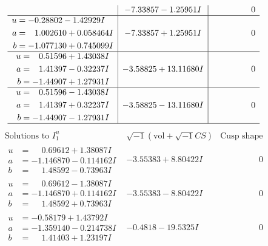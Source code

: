 \documentclass[1p]{elsarticle_modified}
\theoremstyle{definition}
\newcommand{\I}{\sqrt{-1}}
\begin{document}
$$\begin{array}{c|c|c}
 & -7.33857 - 1.25951 I & \phantom{-0.000000 } 0 \\ \hline\begin{aligned}
u &= -0.28802 - 1.42929 I \\
a &= \phantom{-}1.002610 + 0.058464 I \\
b &= -1.077130 + 0.745099 I\end{aligned}
 & -7.33857 + 1.25951 I & \phantom{-0.000000 } 0 \\ \hline\begin{aligned}
u &= \phantom{-}0.51596 + 1.43038 I \\
a &= \phantom{-}1.41397 - 0.32237 I \\
b &= -1.44907 + 1.27931 I\end{aligned}
 & -3.58825 + 13.11680 I & \phantom{-0.000000 } 0 \\ \hline\begin{aligned}
u &= \phantom{-}0.51596 - 1.43038 I \\
a &= \phantom{-}1.41397 + 0.32237 I \\
b &= -1.44907 - 1.27931 I\end{aligned}
 & -3.58825 - 13.11680 I & \phantom{-0.000000 } 0\\
 \hline 
 \end{array}$$\newpage$$\begin{array}{c|c|c}  
\text{Solutions to }I^u_{1}& \I (\text{vol} + \sqrt{-1}CS) & \text{Cusp shape}\\
 \hline 
\begin{aligned}
u &= \phantom{-}0.69612 + 1.38087 I \\
a &= -1.146870 - 0.114162 I \\
b &= \phantom{-}1.48592 - 0.73963 I\end{aligned}
 & -3.55383 + 8.80422 I & \phantom{-0.000000 } 0 \\ \hline\begin{aligned}
u &= \phantom{-}0.69612 - 1.38087 I \\
a &= -1.146870 + 0.114162 I \\
b &= \phantom{-}1.48592 + 0.73963 I\end{aligned}
 & -3.55383 - 8.80422 I & \phantom{-0.000000 } 0 \\ \hline\begin{aligned}
u &= -0.58179 + 1.43792 I \\
a &= -1.359140 - 0.214738 I \\
b &= \phantom{-}1.41403 + 1.23197 I\end{aligned}
 & -0.4818 - 19.5325 I & \phantom{-0.000000 } 0 \\ \hline\begin{aligned}

\end{aligned}
\end{array}$$
\end{document}
